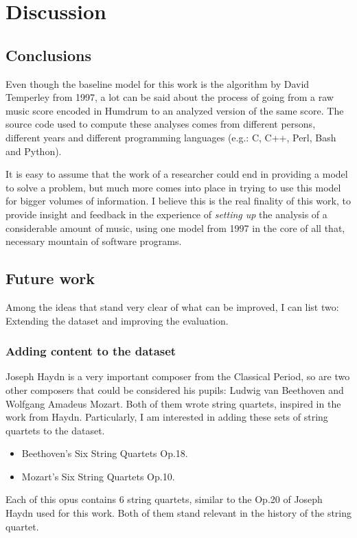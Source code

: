 \chapter{Discussion}
\label{chap:discussion}

\section{Conclusions}
Even though the baseline model for this work is the algorithm by David Temperley from 1997, a lot can be said about the process of going from a raw music score encoded in Humdrum to an analyzed version of the same score. The source code used to compute these analyses comes from different persons, different years and different programming languages (e.g.: C, C++, Perl, Bash and Python).

It is easy to assume that the work of a researcher could end in providing a model to solve a problem, but much more comes into place in trying to use this model for bigger volumes of information. I believe this is the real finality of this work, to provide insight and feedback in the experience of \emph{setting up} the analysis of a considerable amount of music, using one model from 1997 in the core of all that, necessary mountain of software programs.

\section{Future work}
  Among the ideas that stand very clear of what can be improved, I can list two: Extending the dataset and improving the evaluation.
  \subsection{Adding content to the dataset}
    Joseph Haydn is a very important composer from the Classical Period, so are two other composers that could be considered his pupils: Ludwig van Beethoven and Wolfgang Amadeus Mozart. Both of them wrote string quartets, inspired in the work from Haydn. Particularly, I am interested in adding these sets of string quartets to the dataset.
    \begin{itemize}
      \item Beethoven's Six String Quartets Op.18.
      \item Mozart's Six String Quartets Op.10.
    \end{itemize}
  Each of this opus contains 6 string quartets, similar to the Op.20 of Joseph Haydn used for this work. Both of them stand relevant in the history of the string quartet.


